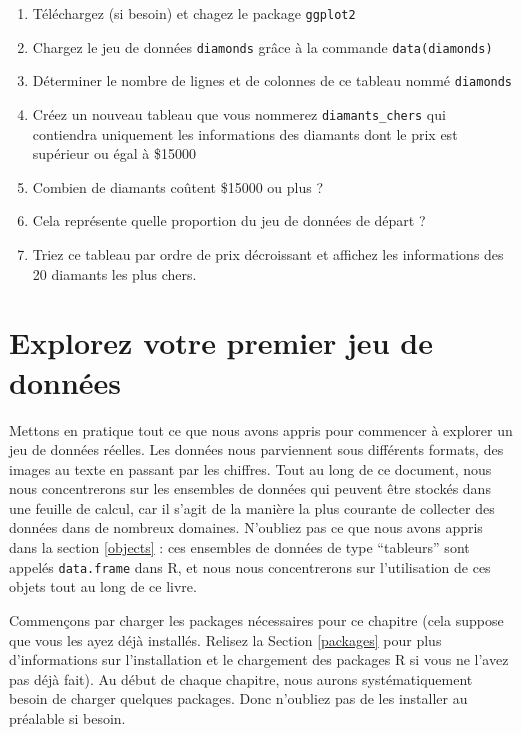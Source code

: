 \documentclass[a4paperpaper,]{article}
\providecommand{\tightlist}{%
  \setlength{\itemsep}{0pt}\setlength{\parskip}{0pt}}
\theoremstyle{definition}
\theoremstyle{definition}
\theoremstyle{definition}
\theoremstyle{remark}
\begin{document}
\begin{enumerate}
\def\labelenumi{\arabic{enumi}.}
\tightlist
\item
  Téléchargez (si besoin) et chagez le package \texttt{ggplot2}
\item
  Chargez le jeu de données \texttt{diamonds} grâce à la commande
  \texttt{data(diamonds)}
\item
  Déterminer le nombre de lignes et de colonnes de ce tableau nommé
  \texttt{diamonds}
\item
  Créez un nouveau tableau que vous nommerez \texttt{diamants\_chers}
  qui contiendra uniquement les informations des diamants dont le prix
  est supérieur ou égal à \$15000
\item
  Combien de diamants coûtent \$15000 ou plus ?
\item
  Cela représente quelle proportion du jeu de données de départ ?
\item
  Triez ce tableau par ordre de prix décroissant et affichez les
  informations des 20 diamants les plus chers.
\end{enumerate}

\section{Explorez votre premier jeu de données}\label{dataset}

Mettons en pratique tout ce que nous avons appris pour commencer à
explorer un jeu de données réelles. Les données nous parviennent sous
différents formats, des images au texte en passant par les chiffres.
Tout au long de ce document, nous nous concentrerons sur les ensembles
de données qui peuvent être stockés dans une feuille de calcul, car il
s'agit de la manière la plus courante de collecter des données dans de
nombreux domaines. N'oubliez pas ce que nous avons appris dans la
section \ref{objects} : ces ensembles de données de type ``tableurs''
sont appelés \texttt{data.frame} dans R, et nous nous concentrerons sur
l'utilisation de ces objets tout au long de ce livre.

Commençons par charger les packages nécessaires pour ce chapitre (cela
suppose que vous les ayez déjà installés. Relisez la Section
\ref{packages} pour plus d'informations sur l'installation et le
chargement des packages R si vous ne l'avez pas déjà fait). Au début de
chaque chapitre, nous aurons systématiquement besoin de charger quelques
packages. Donc n'oubliez pas de les installer au préalable si besoin.
\end{document}
